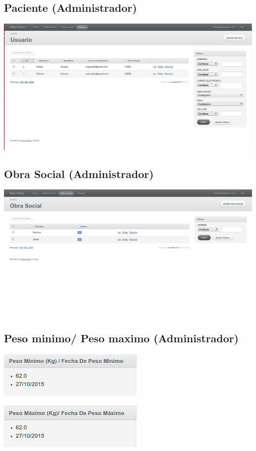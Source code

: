 \documentclass[runningheads,a4paper,spanish]{llncs}
\begin{document}
\subsection{Paciente (Administrador)}
\begin{center}
	\includegraphics[scale=0.3]{paciente.png}
\end{center}

\subsection{Obra Social (Administrador)}
\begin{center}
	\includegraphics[scale=0.3]{obra_social.png}
\end{center}

\subsection{Peso minimo/ Peso maximo (Administrador)}
\begin{center}
	\includegraphics[scale=0.3]{minimo_maximo.png}
\end{center}
\end{document}
